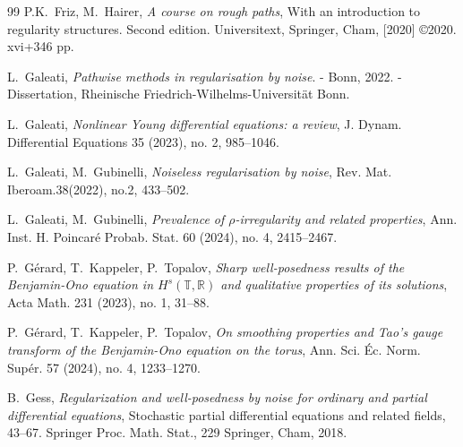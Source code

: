 \documentclass[letterpaper, 11pt,  reqno]{amsart}
\newcommand{\1}{\hspace{0.5mm}\text{I}\hspace{0.5mm}}
\newcommand{\R}{\mathbb{R}}
\newcommand{\T}{\mathbb{T}}
\numberwithin{equation}{section}
\numberwithin{theorem}{section}
\begin{document}
\begin{thebibliography}{99}
P.K.~Friz,  M.~Hairer, 
{\it A course on rough paths}, 
With an introduction to regularity structures. Second edition.
Universitext, Springer, Cham, [2020] \copyright 2020. xvi+346 pp.



%
%

L.~Galeati, 
{\it Pathwise methods in regularisation by noise}. - Bonn, 2022. - Dissertation, 
Rheinische Friedrich-Wilhelms-Universit\"at Bonn. 

L.~Galeati, 
{\it Nonlinear {Y}oung differential equations: a review}, 
J. Dynam. Differential Equations 35 (2023), no. 2, 985--1046.



L.~Galeati, M.~Gubinelli,
{\it Noiseless regularisation by noise}, 
Rev. Mat. Iberoam.38(2022), no.2, 433--502.




L.~Galeati, M.~Gubinelli,
{\it  Prevalence of $\rho$-irregularity and related properties},
 Ann. Inst. H. Poincar\'e Probab. Stat.
 60 (2024), no. 4, 2415--2467.



%
%
%



P.~G\'erard, T.~Kappeler, P.~Topalov,
{\it  Sharp well-posedness results of the Benjamin-Ono equation in $H^s(\T, \R)$  and qualitative properties of its solutions}, 
Acta Math. 231 (2023), no. 1,  31--88.



P.~G\'erard, T.~Kappeler, P.~Topalov,
{\it On smoothing properties and Tao's gauge transform of the Benjamin-Ono equation on the torus},
 Ann. Sci. \'Ec. Norm. Sup\'er.  57 (2024), no. 4, 1233--1270.



B.~Gess, 
{\it Regularization and well-posedness by noise for ordinary and partial differential equations},
 Stochastic partial differential equations and related fields, 43--67. Springer Proc. Math. Stat., 229
Springer, Cham, 2018.





\end{thebibliography}
\end{document}
